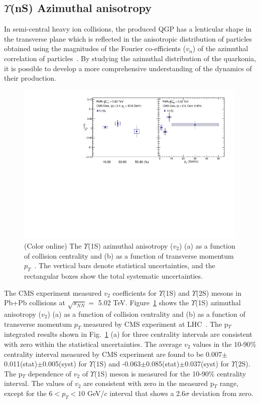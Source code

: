     
    
\subsection{$\Upsilon$(nS) Azimuthal anisotropy}


In semi-central heavy ion collisions,
the produced QGP has a lenticular shape in the transverse plane
which is reflected in the anisotropic
distribution of particles obtained using the magnitudes
of the Fourier co-efficients ($v_{n}$) of the azimuthal correlation of
particles~\cite{Voloshin:1994mz}. By studying the azimuthal distribution of
the quarkonia, it is possible to develop a more comprehensive understanding
of the dynamics of their production.

\begin{figure}
\includegraphics[width=0.99\textwidth]{Figures/Fig10_CMS_Y1S_5TeV_V2.pdf}
\caption{(Color online) The $\Upsilon$(1S) azimuthal anisotropy ($v_{2}$) (a) as a
  function of collision centrality and (b) as a function of transverse momentum
  $p_{T}$~\cite{CMS:2020efs}. The vertical bars denote statistical uncertainties,
  and the rectangular boxes show the total systematic uncertainties.
}
\label{fig:Upsilon1SV2CMS}
\end{figure}



The CMS experiment measured $v_{2}$ coefficients for $\Upsilon$(1S) and $\Upsilon$(2S)
mesons in Pb+Pb collisions at $\sqrt{s_{NN}}=$ 5.02 TeV.
Figure~\ref{fig:Upsilon1SV2CMS} shows the $\Upsilon$(1S) azimuthal
anisotropy ($v_{2}$) (a) as a function of collision centrality and (b) as a
function of transverse momentum $p_{T}$ measured by CMS experiment at
LHC~\cite{CMS:2020efs}. The p$_{T}$ integrated results shown in
Fig.~\ref{fig:Upsilon1SV2CMS} (a) for three centrality intervals are consistent
with zero within the statistical uncertainties. The average $v_{2}$ values in the
10-90$\%$ centrality interval measured by CMS experiment are found to
be 0.007$\pm$0.011(stat)$\pm$0.005(syst) for $\Upsilon$(1S) and
-0.063$\pm$0.085(stat)$\pm$0.037(syst) for $\Upsilon$(2S).   
The p$_{T}$ dependence of  $v_{2}$ of $\Upsilon$(1S) meson is measured
for the 10-90$\%$ centrality interval. The values of $v_{2}$ are consistent with
zero in the measured p$_T$ range, except for the $6<p_T<10$ GeV/$c$ interval that
shows a 2.6$\sigma$ deviation from zero. 

